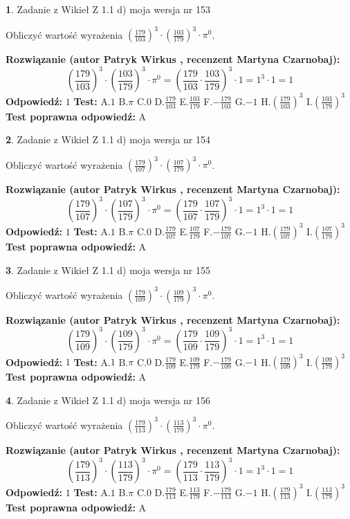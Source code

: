 \documentclass[12pt, a4paper]{article}
\theoremstyle{definition} %
\newtheorem{zad}{}
\newcommand{\zadStart}[1]{\begin{zad}#1\newline}
\newcommand{\zadStop}{\end{zad}}
\newcommand{\rozwStart}[2]{\noindent \textbf{Rozwiązanie (autor #1 , recenzent #2): }\newline}
\newcommand{\rozwStop}{\newline}
\newcommand{\odpStart}{\noindent \textbf{Odpowiedź:}\newline}
\newcommand{\odpStop}{\newline}
\newcommand{\testStart}{\noindent \textbf{Test:}\newline}
\newcommand{\testStop}{\newline}
\newcommand{\kluczStart}{\noindent \textbf{Test poprawna odpowiedź:}\newline}
\newcommand{\kluczStop}{\newline}
\begin{document}
\zadStart{Zadanie z Wikieł Z 1.1 d) moja wersja nr 153}

Obliczyć wartość wyrażenia $(\frac{179}{103})^{3} \cdot (\frac{103}{179})^{3} \cdot \pi^{0}$.
\zadStop
\rozwStart{Patryk Wirkus}{Martyna Czarnobaj}
$$(\frac{179}{103})^{3} \cdot (\frac{103}{179})^{3} \cdot \pi^{0} = (\frac{179}{103} \cdot \frac{103}{179})^{3} \cdot 1 = 1^{3} \cdot 1 = 1$$
\rozwStop
\odpStart
$1$
\odpStop
\testStart
A.$1$ B.$\pi$ C.$0$ D.$\frac{179}{103}$ E.$\frac{103}{179}$
F.$-\frac{179}{103}$ G.$-1$
H.$(\frac{179}{103})^{3}$
I.$(\frac{103}{179})^{3}$
\testStop
\kluczStart
A
\kluczStop



\zadStart{Zadanie z Wikieł Z 1.1 d) moja wersja nr 154}

Obliczyć wartość wyrażenia $(\frac{179}{107})^{3} \cdot (\frac{107}{179})^{3} \cdot \pi^{0}$.
\zadStop
\rozwStart{Patryk Wirkus}{Martyna Czarnobaj}
$$(\frac{179}{107})^{3} \cdot (\frac{107}{179})^{3} \cdot \pi^{0} = (\frac{179}{107} \cdot \frac{107}{179})^{3} \cdot 1 = 1^{3} \cdot 1 = 1$$
\rozwStop
\odpStart
$1$
\odpStop
\testStart
A.$1$ B.$\pi$ C.$0$ D.$\frac{179}{107}$ E.$\frac{107}{179}$
F.$-\frac{179}{107}$ G.$-1$
H.$(\frac{179}{107})^{3}$
I.$(\frac{107}{179})^{3}$
\testStop
\kluczStart
A
\kluczStop



\zadStart{Zadanie z Wikieł Z 1.1 d) moja wersja nr 155}

Obliczyć wartość wyrażenia $(\frac{179}{109})^{3} \cdot (\frac{109}{179})^{3} \cdot \pi^{0}$.
\zadStop
\rozwStart{Patryk Wirkus}{Martyna Czarnobaj}
$$(\frac{179}{109})^{3} \cdot (\frac{109}{179})^{3} \cdot \pi^{0} = (\frac{179}{109} \cdot \frac{109}{179})^{3} \cdot 1 = 1^{3} \cdot 1 = 1$$
\rozwStop
\odpStart
$1$
\odpStop
\testStart
A.$1$ B.$\pi$ C.$0$ D.$\frac{179}{109}$ E.$\frac{109}{179}$
F.$-\frac{179}{109}$ G.$-1$
H.$(\frac{179}{109})^{3}$
I.$(\frac{109}{179})^{3}$
\testStop
\kluczStart
A
\kluczStop



\zadStart{Zadanie z Wikieł Z 1.1 d) moja wersja nr 156}

Obliczyć wartość wyrażenia $(\frac{179}{113})^{3} \cdot (\frac{113}{179})^{3} \cdot \pi^{0}$.
\zadStop
\rozwStart{Patryk Wirkus}{Martyna Czarnobaj}
$$(\frac{179}{113})^{3} \cdot (\frac{113}{179})^{3} \cdot \pi^{0} = (\frac{179}{113} \cdot \frac{113}{179})^{3} \cdot 1 = 1^{3} \cdot 1 = 1$$
\rozwStop
\odpStart
$1$
\odpStop
\testStart
A.$1$ B.$\pi$ C.$0$ D.$\frac{179}{113}$ E.$\frac{113}{179}$
F.$-\frac{179}{113}$ G.$-1$
H.$(\frac{179}{113})^{3}$
I.$(\frac{113}{179})^{3}$
\testStop
\kluczStart
A
\kluczStop
\end{document}
